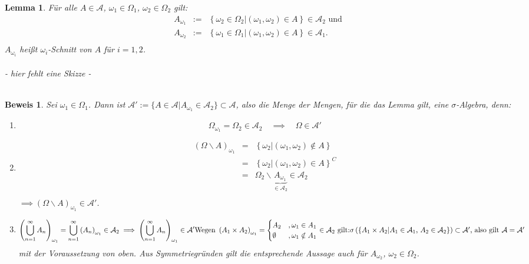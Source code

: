 \documentclass[a4paper,11pt]{book}
\def\AA{ \mathcal{A} }
\def\folgt{\ensuremath{\implies}}
\newtheorem{Lem}{Lemma}[chapter]
\theoremstyle{nonumberplain}
\newtheorem{Bew}{Beweis}
\begin{document}
\begin{Lem} \label{Lem3.1}Für alle $A\in\AA$, $\omega_1\in\Omega_1$, $\omega_2\in\Omega_2$ gilt: \\
\begin{eqnarray*}
A_{\omega_1} &:=& \left\{\omega_2\in\Omega_2|\left(\omega_1,\omega_2\right)\in A\right\}\in\AA_2 \text{ und} \\
A_{\omega_2} &:=& \left\{\omega_1\in\Omega_1|\left(\omega_1,\omega_2\right)\in A\right\}\in\AA_1 \text{.} \\
\end{eqnarray*}
$A_{\omega_i}$ heißt $\omega_i$-Schnitt von $A$ für $i=1,2$. \\
\quad\\
- hier fehlt eine Skizze - \\ %
\quad\\
\end{Lem}
\begin{Bew} Sei $\omega_1\in\Omega_1$. Dann ist $\AA':=\{A\in\AA|A_{\omega_1}\in\AA_2\}\subset\AA$, also die Menge der Mengen, für die das Lemma gilt, eine $\sigma$-Algebra, denn:
\begin{enumerate}
\item[(i)] \begin{displaymath} \Omega_{\omega_1}=\Omega_2\in\AA_2\quad\folgt\quad\Omega\in\AA' \end{displaymath}
\item[(ii)]\begin{eqnarray*}
\left(\Omega\backslash A\right)_{\omega_1} &=& \left\{\omega_2|\left(\omega_1,\omega_2\right)\notin A\right\} \\
 &=& \left\{\omega_2|\left(\omega_1,\omega_2\right)\in A\right\}^C \\
 &=& \Omega_2\backslash\underbrace{A_{\omega_1}}_{\in\AA_2}\in\AA_2 \\
\end{eqnarray*} $\folgt (\Omega\backslash A)_{\omega_1}\in\AA'$.
\item[(iii)]\begin{displaymath}
\left(\bigcup_{n=1}^{\infty}A_n\right)_{\omega_1} = \bigcup_{n=1}^{\infty}\left( A_n\right)_{\omega_1}\in\AA_2 \folgt \left(\bigcup_{n=1}^{\infty}A_n\right)_{\omega_1}\in\AA' $$\\$$
\text{Wegen }\left(A_1\times A_2\right)_{\omega_1}= 
\begin{cases}
A_2 & ,\omega_1\in A_1 \\
\emptyset & ,\omega_1\notin A_1 \\
\end{cases}
\in\AA_2 \text{ gilt:}$$\\$$
\sigma\left(\left\{A_1\times A_2|A_1\in\AA_1\text{, }A_2\in\AA_2\right\}\right)\subset\AA'\text{, also gilt }\AA=\AA'
\end{displaymath}
mit der Voraussetzung von oben. Aus Symmetriegründen gilt die entsprechende Aussage auch für $A_{\omega_2}$, $\omega_2\in\Omega_2$.
\end{enumerate}
\end{Bew}
\end{document}
